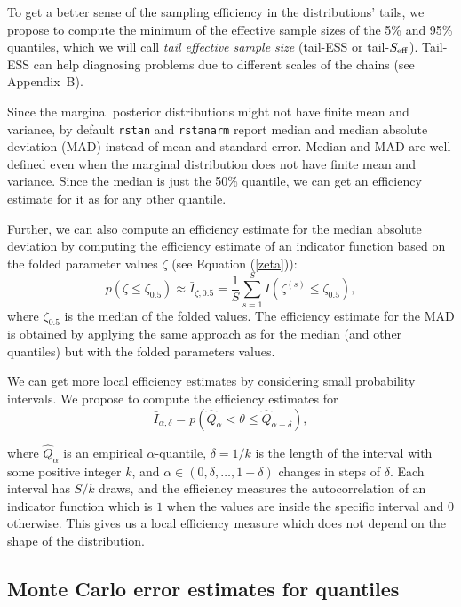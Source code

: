 \documentclass[american,]{article}
\theoremstyle{definition}
\begin{document}
To get a better sense of the sampling efficiency in the
distributions' tails, we propose to compute the minimum of the effective
sample sizes of the 5\% and 95\% quantiles, which we will call
\emph{tail effective sample size} (tail-ESS or tail-\(S_{\rm eff}\)).
Tail-ESS can help diagnosing problems due to different scales of the
chains (see Appendix~B).


Since the marginal posterior distributions might not have finite mean
and variance, by default \texttt{rstan} \citep{RStan.2.17} and \texttt{rstanarm}
\citep{RStanARM.2.17} report median and median absolute deviation (MAD)
instead of mean and standard error. Median and MAD are well defined
even when the marginal distribution does not have finite mean and
variance. Since the median is just the 50\% quantile, we can get an
efficiency estimate for it as for any other quantile.

Further, we can also compute an efficiency estimate for the median
absolute deviation by computing the efficiency estimate of an
indicator function based on the folded parameter values \(\zeta\) (see
Equation (\ref{zeta})):
\begin{equation}
p(\zeta \leq \zeta_{0.5}) \approx \bar{I}_{\zeta,0.5} = \frac{1}{S}\sum_{s=1}^S
I(\zeta^{(s)} \leq \zeta_{0.5}),
\end{equation}
where \(\zeta_{0.5}\) is the median of the folded values. The efficiency estimate for the MAD is obtained by applying the same
approach as for the median (and other quantiles) but with the folded
parameters values.


We can get more local efficiency estimates by considering small
probability intervals. We propose to compute the efficiency estimates
for
\begin{equation}
\bar{I}_{\alpha,\delta} = p(\hat{Q}_\alpha < \theta \leq \hat{Q}_{\alpha+\delta}),
\end{equation}

where \(\hat{Q}_\alpha\) is an empirical \(\alpha\)-quantile,
\(\delta=1/k\) is the length of the interval with some positive integer
\(k\), and \(\alpha \in (0,\delta,\ldots,1-\delta)\) changes in steps of
\(\delta\). Each interval has \(S/k\) draws, and the efficiency measures
the autocorrelation of an indicator function which is \(1\) when the
values are inside the specific interval and \(0\) otherwise. This gives
us a local efficiency measure which does not depend on the shape of the
distribution.

\hypertarget{mcse}{%
\subsection{Monte Carlo error estimates for quantiles}\label{mcse}}
\end{document}
